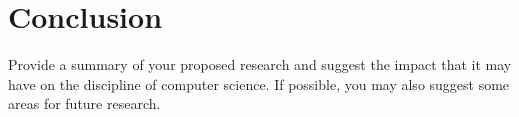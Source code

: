 \documentclass[11pt]{article}
\begin{document}
\section{Conclusion}
\label{sec:conclusion}


Provide a summary of your proposed research and suggest the impact that it may
have on the discipline of computer science. If possible, you may also suggest
some areas for future research.



\end{document}
